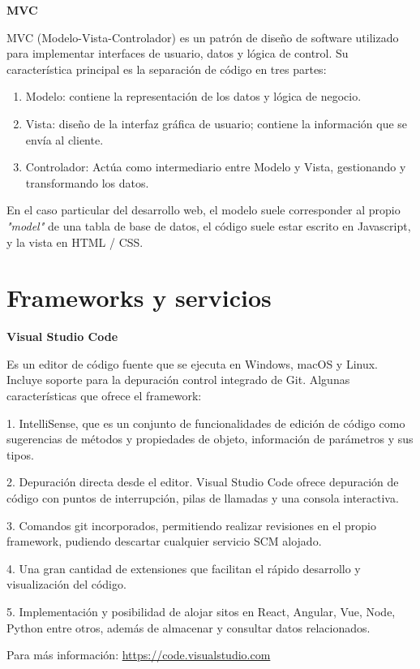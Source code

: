 \textbf{MVC}

MVC (Modelo-Vista-Controlador) es un patrón de diseño de software utilizado para implementar interfaces de usuario, datos y lógica de control. Su característica  principal es la separación de código en tres partes:
\begin{enumerate}
	\item Modelo: contiene la representación de los datos y lógica de negocio.
	\item Vista:  diseño de la interfaz gráfica de usuario; contiene la información que se envía al cliente.
	\item Controlador: Actúa como intermediario entre Modelo y Vista, gestionando y transformando los datos.
\end{enumerate}

En el caso particular del desarrollo web, el modelo suele corresponder al propio \emph{"model"} de una tabla de base de datos, el  código suele estar escrito en Javascript, y la vista  en HTML / CSS.

\section{Frameworks y servicios}

\textbf{Visual Studio Code}

Es un editor de código fuente  que se ejecuta en Windows, macOS y Linux. Incluye soporte  para la depuración control integrado de Git. Algunas características que ofrece el framework:

1. IntelliSense, que es un conjunto de funcionalidades de edición de código como sugerencias  de métodos y propiedades de objeto, información de parámetros y sus tipos.

2. Depuración directa desde el editor. Visual Studio Code ofrece depuración de código con puntos de  interrupción, pilas de llamadas y una consola interactiva.

3. Comandos git incorporados, permitiendo realizar revisiones en el propio framework, pudiendo descartar cualquier servicio SCM alojado.

4.  Una gran cantidad de extensiones que facilitan el rápido desarrollo y visualización del código.

5. Implementación y posibilidad de alojar sitos en React, Angular, Vue, Node, Python entre otros, además de almacenar y consultar datos relacionados.

Para más información: \url{https://code.visualstudio.com}

